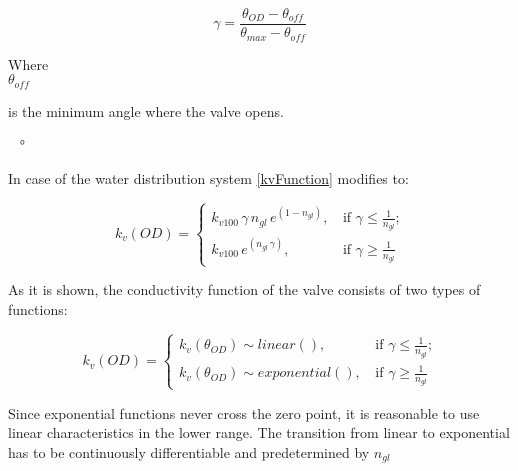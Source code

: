 \begin{equation}
\label{ValveAngle}
 \gamma =  \frac{\theta_{OD}-\theta_{off}}{\theta_{max}-\theta_{off}}
\end{equation}

  \begin{minipage}[t]{0.20\textwidth}
Where\\
\hspace*{8mm} $\theta_{off}$ 
\end{minipage}
\begin{minipage}[t]{0.68\textwidth}
\vspace*{2mm}
is the minimum angle where the valve opens.

\end{minipage}
\begin{minipage}[t]{0.10\textwidth}
\vspace*{2mm}
\textcolor{White}{te}$\unit{\degree}$
\end{minipage}

In case of the water distribution system \eqref{kvFunction} modifies to: 

\begin{equation}
 k_v(OD) =
		\left\{
		\begin{array}{ll}
		
		k_{v100} \, \gamma \, n_{gl} \, e^{(1-n_{gl})} \text{,} & \mbox{ if } 	\gamma \leq \frac{1}					{n_{gl}} \text{;}
\\
		k_{v100} \, e^{(n_{gl} \,\gamma)} \text{,} & \mbox{ if } \gamma \geq \frac{1}{n_{gl}}

		\end{array}
		\right.
\end{equation}	

As it is shown, the conductivity function of the valve consists of two types of functions: 

\begin{equation}
 k_v(OD) =
		\left\{
		\begin{array}{ll}
		
		k_v(\theta_{OD}) \sim linear() \text{,} & \mbox{ if } 	\gamma \leq \frac{1}					{n_{gl}} \text{;}
\\
		k_v(\theta_{OD}) \sim exponential() \text{,} & \mbox{ if } \gamma \geq \frac{1}{n_{gl}}

		\end{array}
		\right.
\end{equation}	

Since exponential functions never cross the zero point, it is reasonable to use linear characteristics in the lower range. The transition from linear to exponential has to be continuously differentiable and predetermined by $n_{gl}$ \citep{Kallesoe2009,keller} 


